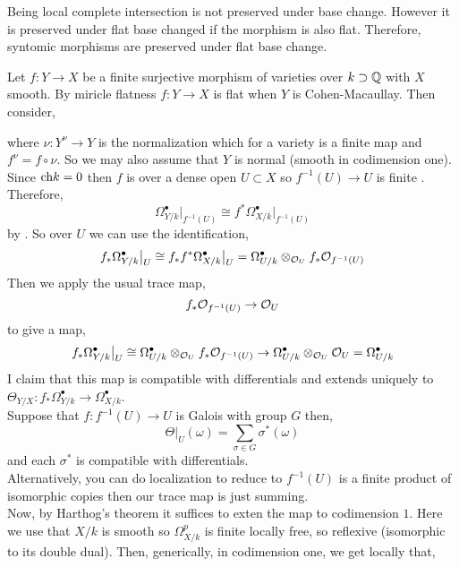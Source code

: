 \documentclass[12pt]{article}
\begin{document}
\begin{remark}
Being local complete intersection is not preserved under base change. However it is preserved under flat base changed if the morphism is also flat. Therefore, syntomic morphisms are preserved under flat base change. 
\end{remark}

\begin{remark}
Let $f : Y \to X$ be a finite surjective morphism of varieties over $k \supset \mathbb{Q}$ with $X$ smooth. By miricle flatness $f : Y \to X$ is flat when $Y$ is Cohen-Macaullay. Then consider,
\begin{center}
\end{center}
where $\nu : Y^\nu \to Y$ is the normalization which for a variety is a finite map and $f^\nu = f \circ \nu$. So we may also assume that $Y$ is normal (smooth in codimension one). Since $\mathrm{ch}{k} = 0$ then $f$ is \etale over a dense open $U \subset X$ so $f^{-1}(U) \to U$ is finite \etale. Therefore,
\[ \Omega^\bullet_{Y / k} \big|_{f^{-1}(U)} \cong f^* \Omega^\bullet_{X / k} \big|_{f^{-1}(U)} \]
by \etale. So over $U$ we can use the identification,
\[ f_* \Omega^\bullet_{Y / k} \big|_U \cong f_* f^* \Omega^\bullet_{X / k} \big|_U = \Omega^\bullet_{U / k} \otimes_{\mathcal{O}_{U}} f_* \mathcal{O}_{f^{-1}(U)} \]
Then we apply the usual trace map,
\[ f_* \mathcal{O}_{f^{-1}(U)} \to \mathcal{O}_{U} \]
to give a map,
\[ f_* \Omega^\bullet_{Y / k} \big|_U \cong \Omega^\bullet_{U / k} \otimes_{\mathcal{O}_{U}} f_* \mathcal{O}_{f^{-1}(U)} \to \Omega^\bullet_{U / k} \otimes_{\mathcal{O}_{U}} \mathcal{O}_{U} = \Omega^\bullet_{U / k} \]
I claim that this map is compatible with differentials and extends uniquely to $\Theta_{Y/ X} : f_* \Omega^\bullet_{Y / k} \to \Omega^\bullet_{X / k}$.
\bigskip\\
Suppose that $f : f^{-1}(U) \to U$ is Galois with group $G$ then,
\[ \Theta|_U(\omega) = \sum_{\sigma \in G} \sigma^*(\omega) \]
and each $\sigma^*$ is compatible with differentials. 
\bigskip\\
Alternatively, you can do \etale localization to reduce to $f^{-1}(U)$ is a finite product of isomorphic copies then our trace map is just summing. 
\bigskip\\
Now, by Harthog's theorem it suffices to exten the map to codimension $1$. Here we use that $X / k$ is smooth so $\Omega^p_{X / k}$ is finite locally free, so reflexive (isomorphic to its double dual). Then, generically, in codimension one, we get \etale locally that,

\end{remark}
\end{document}
